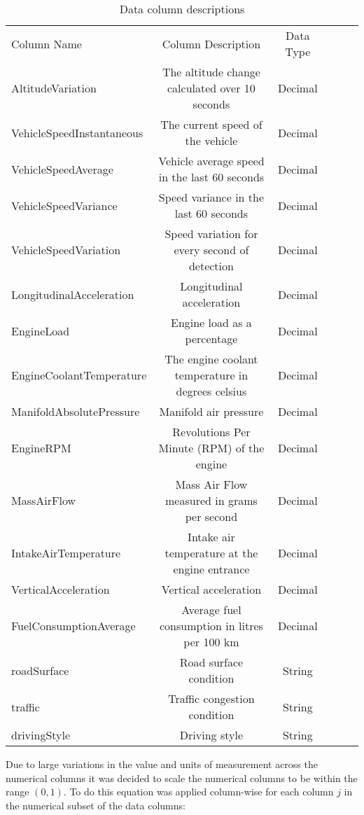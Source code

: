 \documentclass[a4paper,11pt]{article}
\begin{document}
\begin{table}[!ht]
	\caption{Data column descriptions}\label{tab:column_types}
	\centering
	\begin{tabular}{lccccc}\toprule
		Column Name & Column Description & Data Type \\ 
		AltitudeVariation & The altitude change calculated over 10 seconds & Decimal \\ 
		VehicleSpeedInstantaneous & The current speed of the vehicle & Decimal \\ 
		VehicleSpeedAverage & Vehicle average speed in the last 60 seconds & Decimal \\ 
		VehicleSpeedVariance & Speed variance in the last 60 seconds & Decimal \\ 
		VehicleSpeedVariation & Speed variation for every second of detection & Decimal \\ 
		LongitudinalAcceleration & Longitudinal acceleration & Decimal \\ 
		EngineLoad & Engine load as a percentage & Decimal \\ 
		EngineCoolantTemperature & The engine coolant temperature in degrees celsius & Decimal \\ 
		ManifoldAbsolutePressure & Manifold air pressure & Decimal \\ 
		EngineRPM & Revolutions Per Minute (RPM) of the engine & Decimal \\ 
		MassAirFlow & Mass Air Flow measured in grams per second & Decimal \\ 
		IntakeAirTemperature & Intake air temperature at the engine entrance & Decimal \\ 
		VerticalAcceleration & Vertical acceleration & Decimal \\ 
		FuelConsumptionAverage & Average fuel consumption in litres per 100 km & Decimal \\ 
		roadSurface & Road surface condition & String \\ 
		traffic & Traffic congestion condition & String \\ 
		drivingStyle & Driving style & String \\ \bottomrule
	\end{tabular}
\end{table}

Due to large variations in the value and units of measurement across the numerical columns it was decided to scale the numerical columns to be within the range $(0,1)$. To do this equation was applied column-wise for each column $j$ in the numerical subset of the data columns:
\end{document}

